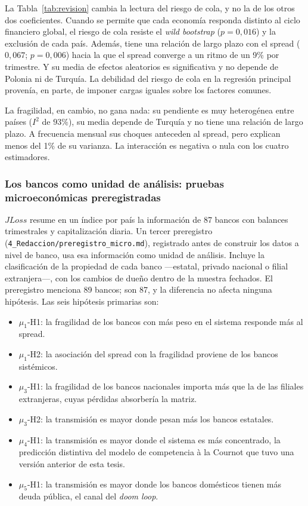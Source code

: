 La Tabla~\ref{tab:revision} cambia la lectura del riesgo de cola, y no la de los otros dos coeficientes. Cuando se permite que cada economía responda distinto al ciclo financiero global, el riesgo de cola resiste el \textit{wild bootstrap} ($p=0{,}016$) y la exclusión de cada país. Además, tiene una relación de largo plazo con el spread ($0{,}067$; $p=0{,}006$) hacia la que el spread converge a un ritmo de un 9\% por trimestre. Y su media de efectos aleatorios es significativa y no depende de Polonia ni de Turquía. La debilidad del riesgo de cola en la regresión principal provenía, en parte, de imponer cargas iguales sobre los factores comunes.

La fragilidad, en cambio, no gana nada: su pendiente es muy heterogénea entre países ($I^2$ de $93\%$), su media depende de Turquía y no tiene una relación de largo plazo. A frecuencia mensual sus choques anteceden al spread, pero explican menos del 1\% de su varianza. La interacción es negativa o nula con los cuatro estimadores.

\subsubsection{Los bancos como unidad de análisis: pruebas microeconómicas preregistradas}
\label{sec:micro-prereg}

$JLoss$ resume en un índice por país la información de 87 bancos con balances trimestrales y capitalización diaria. Un tercer preregistro (\texttt{4\_Redaccion/preregistro\_micro.md}), registrado antes de construir los datos a nivel de banco, usa esa información como unidad de análisis. Incluye la clasificación de la propiedad de cada banco ---estatal, privado nacional o filial extranjera---, con los cambios de dueño dentro de la muestra fechados. El preregistro menciona 89 bancos; son 87, y la diferencia no afecta ninguna hipótesis. Las seis hipótesis primarias son:
\begin{itemize}
    \item $\mu_{1}$-H1: la fragilidad de los bancos con más peso en el sistema responde más al spread.
    \item $\mu_{1}$-H2: la asociación del spread con la fragilidad proviene de los bancos sistémicos.
    \item $\mu_{3}$-H1: la fragilidad de los bancos nacionales importa más que la de las filiales extranjeras, cuyas pérdidas absorbería la matriz.
    \item $\mu_{3}$-H2: la transmisión es mayor donde pesan más los bancos estatales.
    \item $\mu_{4}$-H1: la transmisión es mayor donde el sistema es más concentrado, la predicción distintiva del modelo de competencia à la Cournot que tuvo una versión anterior de esta tesis.
    \item $\mu_{5}$-H1: la transmisión es mayor donde los bancos domésticos tienen más deuda pública, el canal del \textit{doom loop}.
\end{itemize}


